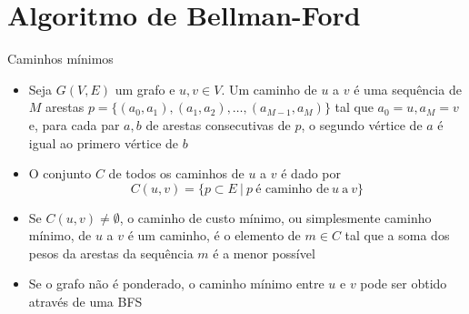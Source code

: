 \section{Algoritmo de Bellman-Ford}

\begin{frame}[fragile]{Caminhos mínimos}

    \begin{itemize}
        \item Seja $G(V, E)$ um grafo e $u, v\in V$. Um caminho de $u$ a $v$ é uma sequência de
            $M$ arestas $p = \lbrace (a_0, a_1), (a_1, a_2), \ldots, (a_{M-1}, a_M)\rbrace$ tal que
            $a_0 = u, a_M = v$ e, para cada par $a, b$ de arestas consecutivas de $p$, o 
            segundo vértice de $a$ é igual ao primero vértice de $b$

        \item O conjunto $C$ de todos os caminhos de $u$ a $v$ é dado por
        \[
            C(u, v) = \lbrace p\subset E\ |\ p\ \mbox{é caminho de}\ u\ \mbox{a}\ v\rbrace
        \]

        \item Se $C(u, v)\neq \emptyset$, o caminho de custo mínimo, ou simplesmente caminho 
        mínimo, de 
        $u$ a $v$ é um caminho, é o elemento de $m\in C$ tal que a soma dos pesos da arestas 
        da sequência $m$ é a menor possível

        \item Se o grafo não é ponderado, o caminho mínimo entre $u$ e $v$ pode ser obtido
            através de uma BFS
    \end{itemize}

\end{frame}

